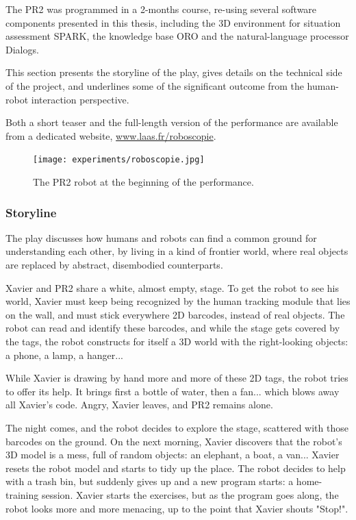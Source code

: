 The PR2 was programmed in a 2-months course, re-using several software
components presented in this thesis, including the 3D environment for situation
assessment SPARK, the knowledge base ORO and the natural-language
processor {\sc Dialogs}.

This section presents the storyline of the play, gives details on the technical
side of the project, and underlines some of the significant outcome from the
human-robot interaction perspective.

Both a short teaser and the full-length version of the performance are
available from a dedicated website, \url{www.laas.fr/roboscopie}.

\begin{figure}
    \centering
    \texttt{[image: experiments/roboscopie.jpg]}
    \caption{The PR2 robot at the beginning of the performance.}
    \label{fig|pr2-opens-curtains}
\end{figure}


\subsubsection{Storyline}

The play discusses how humans and robots can find a common ground for understanding
each other, by living in a kind of frontier world, where real objects are replaced 
by abstract, disembodied counterparts.

Xavier and PR2 share a white, almost empty, stage. To get the robot to see his
world, Xavier must keep being recognized by the human tracking module that lies
on the wall, and must stick everywhere 2D barcodes, instead of real
objects. The robot can read and identify these barcodes, and while the stage
gets covered by the tags, the robot constructs for itself a 3D world with the
right-looking objects: a phone, a lamp, a hanger...

While Xavier is drawing by hand more and more of these 2D tags, the robot tries
to offer its help. It brings first a bottle of water, then a fan... which blows
away all Xavier's code. Angry, Xavier leaves, and PR2 remains alone.

The night comes, and the robot decides to explore the stage, scattered with
those barcodes on the ground. On the next morning, Xavier discovers that the
robot's 3D model is a mess, full of random objects: an elephant, a boat, a
van... Xavier resets the robot model and starts to tidy up the place. The robot
decides to help with a trash bin, but suddenly gives up and a new program
starts: a home-training session. Xavier starts the exercises, but as the
program goes along, the robot looks more and more menacing, up to the point
that Xavier shouts "Stop!".

